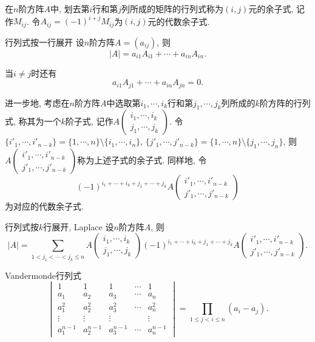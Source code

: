 在$n$阶方阵$A$中, 划去第$i$行和第$j$列所成的矩阵的行列式称为$(i,j)$元的余子式, 记作$M_{ij}$. 令$A_{ij}=(-1)^{i+j}M_{ij}$为$(i,j)$元的代数余子式. 

\begin{theorem}{行列式按一行展开}
	设$n$阶方阵$A=(a_{ij})$, 则$$|A| = a_{i1}A_{i1} + \cdots + a_{in}A_{in}. $$
\end{theorem}
\begin{remark}
	当$i \neq j$时还有$$a_{i1}A_{j1} + \cdots + a_{in}A_{jn}=0. $$
\end{remark}

进一步地, 考虑在$n$阶方阵$A$中选取第$i_1,\cdots ,i_k$行和第$j_1,\cdots ,j_k$列所成的$k$阶方阵的行列式, 称其为一个$k$阶子式, 记作$\displaystyle A \begin{pmatrix}
	i_1,\cdots ,i_k \\ j_1,\cdots ,j_k
\end{pmatrix}$. 令$\{ i'_1,\cdots ,i'_{n-k} \}=\{ 1,\cdots ,n \} \setminus \{ i_1,\cdots ,i_n \}$, $\{ j'_1,\cdots ,j'_{n-k} \}=\{ 1,\cdots ,n \} \setminus \{ j_1,\cdots ,j_n \}$, 则$\displaystyle A \begin{pmatrix}
	i'_1,\cdots ,i'_{n-k} \\ j'_1,\cdots ,j'_{n-k}
\end{pmatrix}$称为上述子式的余子式. 同样地, 令$$(-1)^{i_1+\cdots +i_k+j_1+\cdots +j_k} A \begin{pmatrix}
	i'_1,\cdots ,i'_{n-k} \\ j'_1,\cdots ,j'_{n-k}
\end{pmatrix}$$为对应的代数余子式. 

\begin{theorem}{行列式按$k$行展开, Laplace}
	设$n$阶方阵$A$, 则$$|A| = \sum_{1<j_1<\cdots <j_k \leq n} A\begin{pmatrix}
	i_1,\cdots ,i_k \\ j_1,\cdots ,j_k
\end{pmatrix} (-1)^{i_1+\cdots +i_k+j_1+\cdots +j_k} A \begin{pmatrix}
	i'_1,\cdots ,i'_{n-k} \\ j'_1,\cdots ,j'_{n-k}
\end{pmatrix}.$$
\end{theorem}

\begin{proposition}{Vandermonde行列式}
	$$\begin{vmatrix}
 1 & 1 & 1 & \cdots & 1\\
 a_1 & a_2 & a_3 & \cdots & a_n\\
 a_1^2 & a_2^2 & a_3^2 & \cdots & a_n^2\\
 \vdots & \vdots & \vdots &  & \vdots \\
 a_1^{n-1} & a_2^{n-1} & a_3^{n-1} & \cdots & a_n^{n-1}
\end{vmatrix} = \prod_{1 \leq j < i \leq n} (a_i-a_j).$$
\end{proposition}


